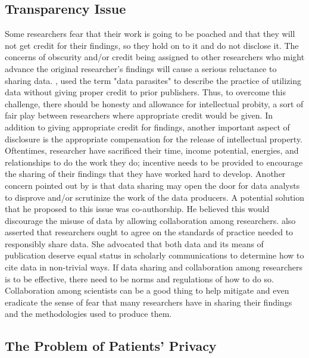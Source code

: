 \documentclass[sigconf]{acmart}
\begin{document}
\subsection{Transparency Issue}

Some researchers fear that their work is going to be poached and that they will not get credit for their findings, so they hold on to it and do not disclose it. The concerns of obscurity and/or credit being assigned to other researchers who might advance the original researcher's findings will cause a serious reluctance to sharing data. \cite{leetaru2016}, used the term "data parasites" to describe the practice of utilizing data without giving proper credit to prior publishers. Thus, to overcome this challenge, there should be honesty and allowance for intellectual probity, a sort of fair play between researchers where appropriate credit would be given. In addition to giving appropriate credit for findings, another important aspect of disclosure is the appropriate compensation for the release of intellectual property. Oftentimes, researcher have sacrificed their time, income potential, energies, and relationships to do the work they do; incentive needs to be provided to encourage the sharing of their findings that they have worked hard to develop.
Another concern pointed out by \cite{leetaru2016} is that data sharing may open the door for data analysts to disprove and/or scrutinize the work of the data producers. A potential solution that he proposed to this issue was co-authorship. He believed this would discourage the misuse of data by allowing collaboration among researchers. \cite{borgman2015if} also asserted that researchers ought to agree on the standards of practice needed to responsibly share data. She advocated that both data and its means of publication deserve equal status in scholarly communications to determine how to cite data in non-trivial ways. If data sharing and collaboration among researchers is to be effective, there need to be norms and regulations of how to do so. Collaboration among scientists can be a good thing to help mitigate and even eradicate the sense of fear that many researchers have in sharing their findings and the methodologies used to produce them. 

\subsection{The Problem of Patients' Privacy}
\end{document}
